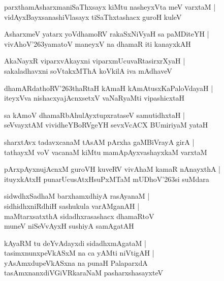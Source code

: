 \documentclass[twoside,12pt,openright]{book}
\def\S{\char'263}
\newcounter{shloka}[chapter]
\begin{document}
\begin{shloka}
parxthamAsharxmaniSaThxsayx kiMtu nasheyxVta meV varxtaM |\\
vidAyxBayxsanashiVlasayx tiSaThxtashacx guroH kuleV 
\end{shloka}

\begin{shloka}
AsharxmeV yatarx yoVdhamoRV rakaSxNiVyaH sa paMDiteYH |\\
vivAhoV\S yamatoV maneyxV na dhamaR iti kanayxkAH 
\end{shloka}

\begin{shloka}
AkaNayxR viparxvAkayxni viparxmUcuvaRtasirxrXyaH |\\
sakaladhavxni soVtakxMThA koVkilA iva mAdhaveV 
\end{shloka}

\begin{shloka}
dhamARdathoRV\S thaRtaH kAmaH kAmAtusxKaPaloVdayaH |\\
iteyxVva nishacxyajAcnxsetxV vaNaRyaMti vipashicxtaH
\end{shloka}

\begin{shloka}
sa kAmoV dhamaRbAhulAyxtupxrataseV samutidhxtaH |\\
seVvayxtAM vividheYBoRVgeYH sevxVcACX BUmiriyaM yataH 
\end{shloka}

\begin{shloka}
sharxtAvx tadavxcanaM tAsAM pArxha gaMBiVrayA girA |\\
tathayxM voV vacanaM kiMtu mamApAyxvashayxkaM varxtaM 
\end{shloka}

\begin{shloka}
pArxpAyxnujAcnxM guroVH kuveRV vivAhaM kamaR nAnayxthA |\\
ituyxkAtxH punarUcusAtxHsuPxMTaM mUDhoV\S si suMdara
\end{shloka}

\begin{shloka}
sidwdhxSadhaM barxhamxdhiyA rasAyanaM |\\
sidhidhxniRdhiH sashukula varAMganAH |\\
maMtarxsatxthA sidadhxrasashacx dhamaRtoV \\
muneV niSeVvAyxH sushiyA samAgatAH
\end{shloka}

\begin{shloka}
kAyaRM tu deYvAdayxdi sidadhxmAgataM |\\
tasimxnunxpeVkASxM na ca yAMti niVtigAH |\\
yAsAmxdupeVkASxna na punaH PalaparxdA \\
tasAmxnanxdiVGiVRkaraNaM pasharxshasayxteV 
\end{shloka}
\end{document}
